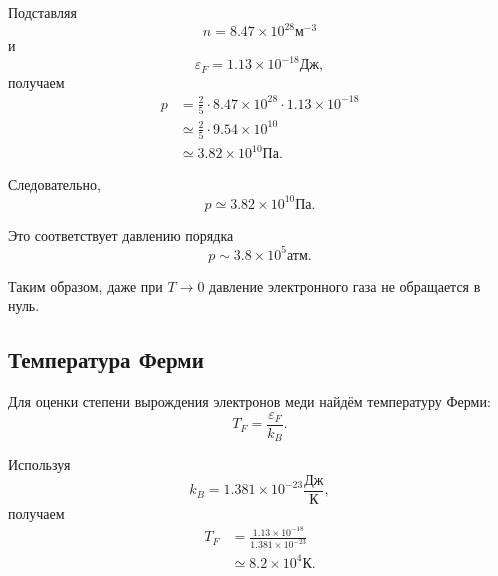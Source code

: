 \documentclass[../final.tex]{subfiles}
\begin{document}
Подставляя
%
\begin{equation*}
    n
    =
    8.47\times10^{28}
    \text{м}^{-3}
\end{equation*}
%
и
%
\begin{equation*}
    \varepsilon_F
    =
    1.13\times10^{-18}
    \text{Дж},
\end{equation*}
%
получаем
%
\begin{align*}
    p
    &=
    \frac{2}{5}
    \cdot
    8.47\times10^{28}
    \cdot
    1.13\times10^{-18}
    \\[3pt]
    &\simeq
    \frac{2}{5}
    \cdot
    9.54\times10^{10}
    \\[3pt]
    &\simeq
    3.82\times10^{10}
    \text{Па}.
\end{align*}

Следовательно,
%
\begin{equation*}
    \boxed{
        p
        \simeq
        3.82\times10^{10}
        \text{Па}
    }.
\end{equation*}

Это соответствует давлению порядка
%
\begin{equation*}
    p
    \sim
    3.8\times10^5
    \text{атм}.
\end{equation*}

Таким образом, даже при $T\to0$ давление электронного газа
не обращается в нуль.



\subsection*{Температура Ферми}

Для оценки степени вырождения электронов меди найдём температуру Ферми:
%
\begin{equation*}
    T_F
    =
    \frac{
        \varepsilon_F
    }{
        k_B
    }.
\end{equation*}

Используя
%
\begin{equation*}
    k_B
    =
    1.381\times10^{-23}
    \frac{
        \text{Дж}
    }{
        \text{К}
    },
\end{equation*}
%
получаем
%
\begin{align*}
    T_F
    &=
    \frac{
        1.13\times10^{-18}
    }{
        1.381\times10^{-23}
    }
    \\[3pt]
    &\simeq
    8.2\times10^4
    \text{К}.
\end{align*}
\end{document}
